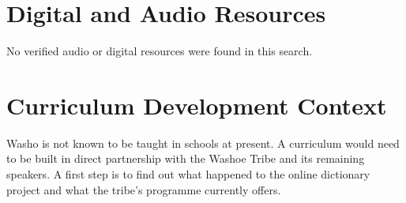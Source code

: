 \documentclass[12pt]{article}
\begin{document}
\section{Digital and Audio Resources}
No verified audio or digital resources were found in this search.

\section{Curriculum Development Context}
Washo is not known to be taught in schools at present. A curriculum would need to be built in direct partnership with the Washoe Tribe and its remaining speakers. A first step is to find out what happened to the online dictionary project and what the tribe's programme currently offers.
\end{document}
